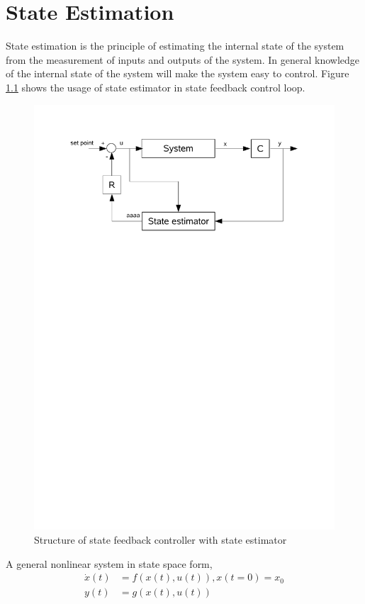 \chapter{State Estimation}
State estimation is the principle of estimating the internal state of the system from the measurement of inputs and outputs of the system. In general knowledge of the internal state of the system will make the system easy to control. Figure \ref{fig:observer} shows the usage of state estimator in state feedback control loop.
\begin{figure}[h]
  \centering
  \includegraphics[trim = 10mm 200mm 20mm 20mm, clip,scale=0.80]{Bilder/system_observer.pdf}
  \caption{Structure of state feedback controller with state estimator}
  \label{fig:observer}
\end{figure}

A general nonlinear system in state space form,
\begin{equation}
\begin{split}
\label{eqn:nl_sys}
\dot{x}(t) &= f(x(t),u(t)) , x(t=0) = x_0 \\
y(t) &= g(x(t),u(t))
\end{split}
\end{equation}

